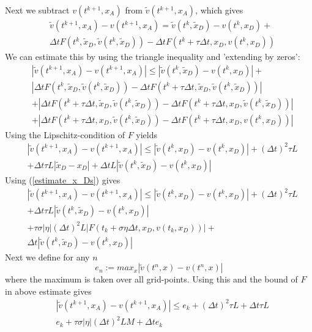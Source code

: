 \documentclass[17pt]{extarticle}
\begin{document}
Next we subtract $v(t^{k+1}, x_A)$ from $\tilde{v}(t^{k+1}, x_A)$, which gives
\begin{align*}
	&\tilde{v}(t^{k+1}, x_A)-v(t^{k+1}, x_A)=\tilde{v}(t^k, \tilde{x}_D)-v(t^k, x_D)+\\
	&\Delta t F(t^k, \tilde{x}_D, \tilde{v}(t^k, \tilde{x}_D))
	-\Delta t  F(t^k+\tau\Delta t, x_D, v(t^k, x_D))
\end{align*}
We can estimate this by using the triangle inequality and 'extending by zeros':
\begin{align*}
	&|\tilde{v}(t^{k+1}, x_A)-v(t^{k+1}, x_A)|\leq|\tilde{v}(t^k, \tilde{x}_D)-v(t^k, x_D)|+\\
	&|\Delta t F(t^k, \tilde{x}_D, \tilde{v}(t^k, \tilde{x}_D))
	-\Delta t  F(t^k+\tau\Delta t, \tilde{x}_D, \tilde{v}(t^k, \tilde{x}_D))|\\
	&+|\Delta t  F(t^k+\tau\Delta t, \tilde{x}_D, \tilde{v}(t^k, \tilde{x}_D))-
	\Delta t  F(t^k+\tau\Delta t, x_D, \tilde{v}(t^k, \tilde{x}_D))|\\
	&+|\Delta t  F(t^k+\tau\Delta t, x_D, \tilde{v}(t^k, \tilde{x}_D))-
	\Delta t  F(t^k+\tau\Delta t, x_D, v(t^k, x_D))|
\end{align*}
Using the Lipschitz-condition of $F$ yields
\begin{align*}
	&|\tilde{v}(t^{k+1}, x_A)-v(t^{k+1}, x_A)|\leq
	|\tilde{v}(t^k, x_D)-v(t^k, x_D)|+
	(\Delta t)^2\tau L\\
	& + \Delta t \tau L|\tilde{x}_D-x_D|+
	\Delta t L |\tilde{v}(t^k, \tilde{x}_D)-v(t^k, x_D)|
\end{align*}
Using (\ref{estimate_x_Ds}) gives
\begin{align*}
	&|\tilde{v}(t^{k+1}, x_A)-v(t^{k+1}, x_A)|\leq
	|\tilde{v}(t^k, x_D)-v(t^k, x_D)|+
	(\Delta t)^2\tau L\\
	& + \Delta t \tau L
	|\tilde{v}(t^k, \tilde{x}_D)-v(t^k, x_D)|\\
	&+\tau\sigma|\eta|(\Delta t)^2 L|F(t_k+\sigma\eta\Delta t, x_D, v(t_k, x_D))|+\\
	&	\Delta t |\tilde{v}(t^k, \tilde{x}_D)-v(t^k, x_D)|
\end{align*}
Next we define for any $n$
$$
e_{n}:=max_{x}|\tilde{v}(t^n, x)-v(t^n, x)|
$$
where the maximum is taken over all grid-points.
Using this and the bound of $F$ in above estimate gives
\begin{align*}
	&|\tilde{v}(t^{k+1}, x_A)-v(t^{k+1}, x_A)|\leq
	e_k+
	(\Delta t)^2\tau L
	 + \Delta t \tau L\\
	 &
	e_k+\tau\sigma|\eta|(\Delta t)^2 LM+
	\Delta t e_k
\end{align*}
\end{document}
